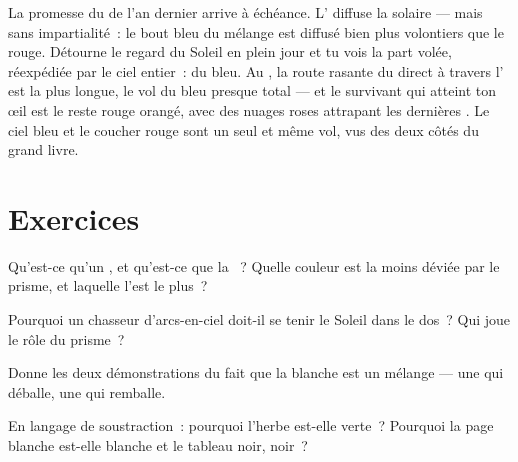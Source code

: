 \begin{remark}\label{rem:g8:colors-spectra:sunset}
La promesse du  de l'an dernier arrive à échéance.
L' diffuse la  solaire --- mais sans impartialité~: le bout
bleu du mélange est diffusé bien plus volontiers que le rouge.
Détourne le regard du Soleil en plein jour et tu vois la part volée,
réexpédiée par le ciel entier~: du bleu. Au , la
route rasante du  direct à travers l' est la plus longue,
le vol du bleu presque total --- et le survivant qui atteint ton œil
est le reste rouge orangé, avec des nuages roses attrapant les
dernières . Le ciel bleu et le coucher rouge sont un seul et
même vol, vus des deux côtés du grand livre.
\end{remark}

\section{Exercices}

\begin{exercise}[$\star$]\label{exo:g8:colors-spectra:1}
Qu'est-ce qu'un , et qu'est-ce que la ~? Quelle
couleur est la moins déviée par le prisme, et laquelle l'est le plus~?
\end{exercise}

\begin{exercise}[$\star$]\label{exo:g8:colors-spectra:2}
Pourquoi un chasseur d'arcs-en-ciel doit-il se tenir le Soleil dans le
dos~? Qui joue le rôle du prisme~?
\end{exercise}

\begin{exercise}[$\star$]\label{exo:g8:colors-spectra:3}
Donne les deux démonstrations du fait que la  blanche est un
mélange --- une qui déballe, une qui remballe.
\end{exercise}

\begin{exercise}[$\star$]\label{exo:g8:colors-spectra:4}
En langage de soustraction~: pourquoi l'herbe est-elle verte~?
Pourquoi la page blanche est-elle blanche et le tableau noir, noir~?
\end{exercise}

